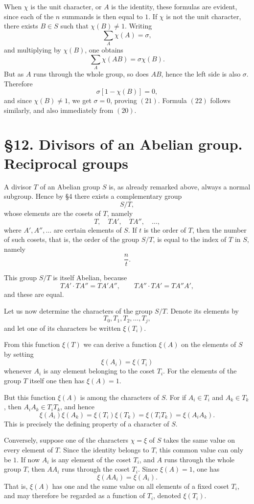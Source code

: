\documentclass[11pt,a4paper]{book}
\begin{document}
When \(\chi\) is the unit character, or \(A\) is the identity, these formulas are evident, since each of the \(n\) summands is then equal to \(1\). If \(\chi\) is not the unit character, there exists \(B\in S\) such that \(\chi(B)\neq 1\). Writing
\[
\sum_A \chi(A)=\sigma,
\]
and multiplying by \(\chi(B)\), one obtains
\[
\sum_A \chi(AB)=\sigma\chi(B).
\]
But as \(A\) runs through the whole group, so does \(AB\), hence the left side is also \(\sigma\). Therefore
\[
\sigma[1-\chi(B)]=0,
\]
and since \(\chi(B)\neq 1\), we get \(\sigma=0\), proving \((21)\). Formula \((22)\) follows similarly, and also immediately from \((20)\).

\section*{\S 12. Divisors of an Abelian group. Reciprocal groups}

A divisor \(T\) of an Abelian group \(S\) is, as already remarked above, always a normal subgroup. Hence by \S 4 there exists a complementary group
\[
S/T,
\]
whose elements are the cosets of \(T\), namely
\[
T,\quad TA',\quad TA'',\quad \dots,
\tag{1}
\]
where \(A',A'',\dots\) are certain elements of \(S\). If \(t\) is the order of \(T\), then the number of such cosets, that is, the order of the group \(S/T\), is equal to the index of \(T\) in \(S\), namely
\[
\frac{n}{t}.
\]

This group \(S/T\) is itself Abelian, because
\[
TA'\cdot TA'' = TA'A'',
\qquad
TA''\cdot TA' = TA''A',
\]
and these are equal.

Let us now determine the characters of the group \(S/T\). Denote its elements by
\[
T_0,T_1,T_2,\dots,T_j,
\tag{2}
\]
and let one of its characters be written \(\xi(T_i)\).

From this function \(\xi(T)\) we can derive a function \(\xi(A)\) on the elements of \(S\) by setting
\[
\xi(A_i)=\xi(T_i)
\tag{3}
\]
whenever \(A_i\) is any element belonging to the coset \(T_i\). For the elements of the group \(T\) itself one then has \(\xi(A)=1\).

But this function \(\xi(A)\) is among the characters of \(S\). For if \(A_i\in T_i\) and \(A_k\in T_k\), then \(A_iA_k\in T_iT_k\), and hence
\[
\xi(A_i)\xi(A_k)=\xi(T_i)\xi(T_k)=\xi(T_iT_k)=\xi(A_iA_k).
\tag{4}
\]
This is precisely the defining property of a character of \(S\).

Conversely, suppose one of the characters \(\chi=\xi\) of \(S\) takes the same value on every element of \(T\). Since the identity belongs to \(T\), this common value can only be \(1\). If now \(A_i\) is any element of the coset \(T_i\), and \(A\) runs through the whole group \(T\), then \(AA_i\) runs through the coset \(T_i\). Since \(\xi(A)=1\), one has
\[
\xi(AA_i)=\xi(A_i).
\tag{5}
\]
That is, \(\xi(A)\) has one and the same value on all elements of a fixed coset \(T_i\), and may therefore be regarded as a function of \(T_i\), denoted \(\xi(T_i)\).
\end{document}
